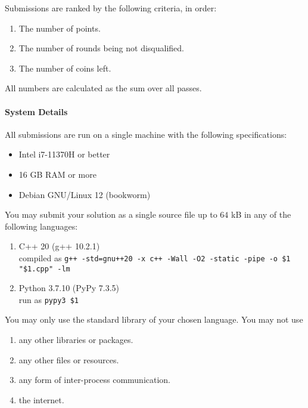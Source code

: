 \documentclass[
    a4paper,
    12pt,
    parskip=half,
    headings=standardclasses,
    footskip=0pt,
    footlines=1,
    headheight=80in
]{scrartcl}
\begin{document}
Submissions are ranked by the following criteria, in order:
\begin{enumerate}
    \item The number of points.
    \item The number of rounds being not disqualified.
    \item The number of coins left.
\end{enumerate}
All numbers are calculated as the sum over all passes.

\paragraph*{System Details} All submissions are run on a single machine with the
following specifications:
\begin{itemize}
    \item Intel i7-11370H or better
    \item 16 GB RAM or more
    \item Debian GNU/Linux 12 (bookworm)
\end{itemize}

You may submit your solution as a single source file up to $64$ kB in any of the following
languages:
\begin{enumerate}
    \raggedright
    \item C++ 20 (g++ 10.2.1)\\[4pt]compiled as \texttt{g++ -std=gnu++20 -x c++ -Wall -O2 -static -pipe -o \$1 "\$1.cpp" -lm}
    \item Python 3.7.10 (PyPy 7.3.5)\\[4pt]run as \texttt{pypy3 \$1}
\end{enumerate}
You may only use the standard library of your chosen language.
You may not use
\begin{enumerate}
    \item any other libraries or packages.
    \item any other files or resources.
    \item any form of inter-process communication.
    \item the internet.
\end{enumerate}
\end{document}
